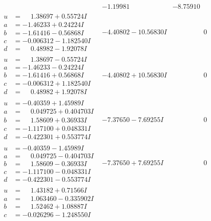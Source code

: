 \documentclass[1p]{elsarticle_modified}
\theoremstyle{definition}
\begin{document}
$$\begin{array}{c|c|c}
 & -1.19981\phantom{ +0.000000I} & -8.75910\phantom{ +0.000000I} \\ \hline\begin{aligned}
u &= \phantom{-}1.38697 + 0.55724 I \\
a &= -1.46233 + 0.24224 I \\
b &= -1.61416 - 0.56868 I \\
c &= -0.006312 - 1.182540 I \\
d &= \phantom{-}0.48982 - 1.92078 I\end{aligned}
 & -4.40802 - 10.56830 I & \phantom{-0.000000 } 0 \\ \hline\begin{aligned}
u &= \phantom{-}1.38697 - 0.55724 I \\
a &= -1.46233 - 0.24224 I \\
b &= -1.61416 + 0.56868 I \\
c &= -0.006312 + 1.182540 I \\
d &= \phantom{-}0.48982 + 1.92078 I\end{aligned}
 & -4.40802 + 10.56830 I & \phantom{-0.000000 } 0 \\ \hline\begin{aligned}
u &= -0.40359 + 1.45989 I \\
a &= \phantom{-}0.049725 + 0.404703 I \\
b &= \phantom{-}1.58609 + 0.36933 I \\
c &= -1.117100 + 0.048331 I \\
d &= -0.422301 + 0.553774 I\end{aligned}
 & -7.37650 - 7.69255 I & \phantom{-0.000000 } 0 \\ \hline\begin{aligned}
u &= -0.40359 - 1.45989 I \\
a &= \phantom{-}0.049725 - 0.404703 I \\
b &= \phantom{-}1.58609 - 0.36933 I \\
c &= -1.117100 - 0.048331 I \\
d &= -0.422301 - 0.553774 I\end{aligned}
 & -7.37650 + 7.69255 I & \phantom{-0.000000 } 0 \\ \hline\begin{aligned}
u &= \phantom{-}1.43182 + 0.71566 I \\
a &= \phantom{-}1.063460 - 0.335902 I \\
b &= \phantom{-}1.52462 + 1.08887 I \\
c &= -0.026296 - 1.248550 I \\

\end{aligned}
\end{array}$$
\end{document}
